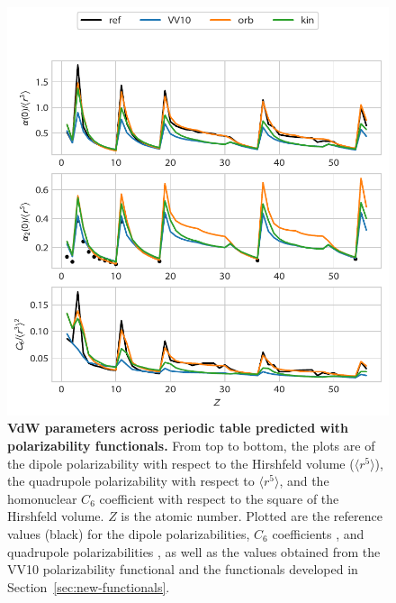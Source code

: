 \begin{figure}
\includegraphics{media/pol-periodic-table.pdf}
\caption{\textbf{VdW parameters across periodic table predicted with polarizability functionals.}
From top to bottom, the plots are of the dipole polarizability with respect to the Hirshfeld volume ($\langle r^5\rangle$), the quadrupole polarizability with respect to $\langle r^5\rangle$, and the homonuclear $C_6$ coefficient with respect to the square of the Hirshfeld volume.
$Z$ is the atomic number.
Plotted are the reference values (black) for the dipole polarizabilities, $C_6$ coefficients \citep{GouldJCTC16}, and quadrupole polarizabilities \citep{AbdalmoneamJPBAMOP14,SchmidtPRB79,SternheimerPRA70,ReinschPRA78,SahooCPL07,KomasaPRA01}, as well as the values obtained from the VV10 polarizability functional and the functionals developed in Section~\ref{sec:new-functionals}.
}\label{fig:pol-periodic-table}
\end{figure}

